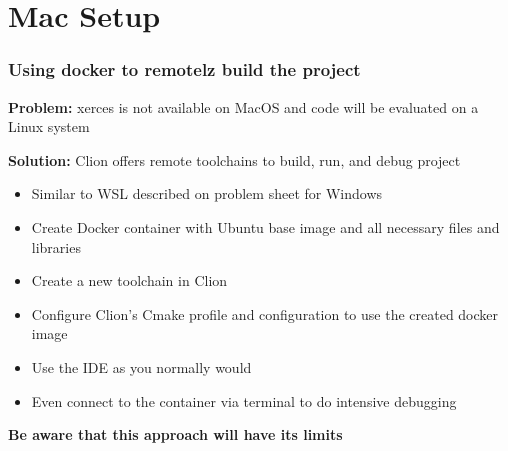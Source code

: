 \section{Mac Setup}

\begin{frame}
    \frametitle{Using docker to remotelz build the project}

    \textbf{Problem:} xerces is not available on MacOS and code will be evaluated on a Linux system

    \textbf{Solution:} Clion offers remote toolchains to build, run, and debug project

    \begin{itemize}
        \item Similar to WSL described on problem sheet for Windows
        \item Create Docker container with Ubuntu base image and all necessary files and libraries
        \item Create a new toolchain in Clion
        \item Configure Clion's Cmake profile and configuration to use the created docker image
        \item Use the IDE as you normally would
        \item Even connect to the container via terminal to do intensive debugging
    \end{itemize}

    \textbf{Be aware that this approach will have its limits}
\end{frame}